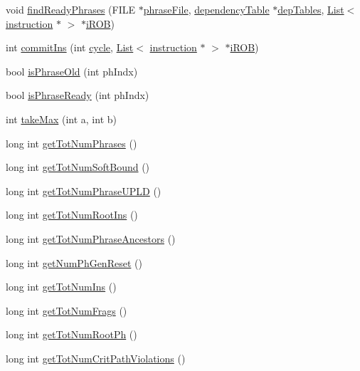 \begin{DoxyCompactItemize}
\item 
void \hyperlink{classphraseGen_ab1fd52686e66bea06bd08d7fc8a4eb23}{findReadyPhrases} (FILE $\ast$\hyperlink{bkEnd_8cpp_a77fc2d35c5f7077be762435e06e16bd2}{phraseFile}, \hyperlink{classdependencyTable}{dependencyTable} $\ast$\hyperlink{vliwScheduler_8cpp_ab1dae06b10269a1b683512c8ecb25def}{depTables}, \hyperlink{classList}{List}$<$ \hyperlink{classinstruction}{instruction} $\ast$ $>$ $\ast$\hyperlink{backend_2parser_8cpp_ad73ae25f81e6e99482f3fbd5ba9664ce}{iROB})
\item 
int \hyperlink{classphraseGen_aa1371990d9d8c3f0804bea4a6129cbae}{commitIns} (int \hyperlink{vliwScheduler_8cpp_a1f4871d45089b039d95d3832dd123827}{cycle}, \hyperlink{classList}{List}$<$ \hyperlink{classinstruction}{instruction} $\ast$ $>$ $\ast$\hyperlink{backend_2parser_8cpp_ad73ae25f81e6e99482f3fbd5ba9664ce}{iROB})
\item 
bool \hyperlink{classphraseGen_a582a2a74fe8029250138b0736b1fa6f5}{isPhraseOld} (int phIndx)
\item 
bool \hyperlink{classphraseGen_aa63dd2ce73bcee18bea216bbc4899c76}{isPhraseReady} (int phIndx)
\item 
int \hyperlink{classphraseGen_ae79ea02ec875c2586543f8c844c721a0}{takeMax} (int a, int b)
\item 
long int \hyperlink{classphraseGen_a6e9a854159318aafbdb4aeb1d6c7609e}{getTotNumPhrases} ()
\item 
long int \hyperlink{classphraseGen_ac91b5f9a9b4e038cb397e79ecea98c40}{getTotNumSoftBound} ()
\item 
long int \hyperlink{classphraseGen_ad853722a4f3ef17f583cd236a6c4f397}{getTotNumPhraseUPLD} ()
\item 
long int \hyperlink{classphraseGen_a40b524e55853cfb78e019db073e225a7}{getTotNumRootIns} ()
\item 
long int \hyperlink{classphraseGen_abcaefae560beb7b38bd23262084b3106}{getTotNumPhraseAncestors} ()
\item 
long int \hyperlink{classphraseGen_a05531ef5a4c9b60ce2454c7353f504f2}{getNumPhGenReset} ()
\item 
long int \hyperlink{classphraseGen_ac8303811636725258f09c09ab61342b3}{getTotNumIns} ()
\item 
long int \hyperlink{classphraseGen_aa0b1991a44addd0187d03d62319a3876}{getTotNumFrags} ()
\item 
long int \hyperlink{classphraseGen_a394ade353944ef69fc1cc675f8a7a458}{getTotNumRootPh} ()
\item 
long int \hyperlink{classphraseGen_a4d1fdc45f4608ba6fc5b1f0034a5757e}{getTotNumCritPathViolations} ()
\end{DoxyCompactItemize}


